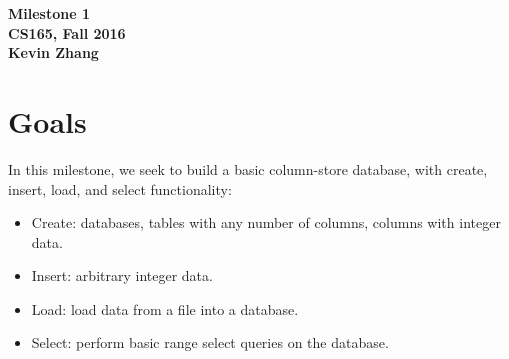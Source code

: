 \documentclass[12pt]{article}
\begin{document}
\begin{center}
\textbf{Milestone 1 \\ CS165, Fall 2016 \\ Kevin Zhang}
\end{center}

\section{Goals}
In this milestone, we seek to build a basic column-store database, with create, insert, load, and select functionality:
\begin{itemize}
\setlength\itemsep{0cm}
\item Create: databases, tables with any number of columns, columns with integer data.
\item Insert: arbitrary integer data.
\item Load: load data from a file into a database.
\item Select: perform basic range select queries on the database.
\end{itemize}
\end{document}
